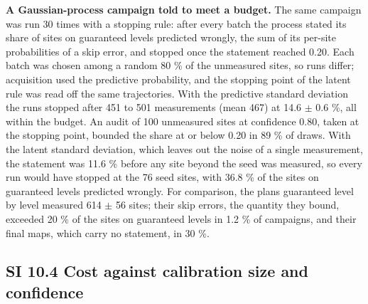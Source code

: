 \documentclass{iopjournal}
\begin{document}
\textbf{A Gaussian-process campaign told to meet a budget.} The same campaign was run 30 times with a stopping rule: after every batch the process stated its share of sites on guaranteed levels predicted wrongly, the sum of its per-site probabilities of a skip error, and stopped once the statement reached 0.20. Each batch was chosen among a random 80 \% of the unmeasured sites, so runs differ; acquisition used the predictive probability, and the stopping point of the latent rule was read off the same trajectories. With the predictive standard deviation the runs stopped after 451 to 501 measurements (mean 467) at 14.6 \ensuremath{\pm} 0.6 \%, all within the budget. An audit of 100 unmeasured sites at confidence 0.80, taken at the stopping point, bounded the share at or below 0.20 in 89 \% of draws. With the latent standard deviation, which leaves out the noise of a single measurement, the statement was 11.6 \% before any site beyond the seed was measured, so every run would have stopped at the 76 seed sites, with 36.8 \% of the sites on guaranteed levels predicted wrongly. For comparison, the plans guaranteed level by level measured 614 \ensuremath{\pm} 56 sites; their skip errors, the quantity they bound, exceeded 20 \% of the sites on guaranteed levels in 1.2 \% of campaigns, and their final maps, which carry no statement, in 30 \%.

\hypertarget{si-10.4-cost-against-calibration-size-and-confidence}{%
\subsection*{SI 10.4 Cost against calibration size and confidence}\label{si-10.4-cost-against-calibration-size-and-confidence}}
\end{document}

